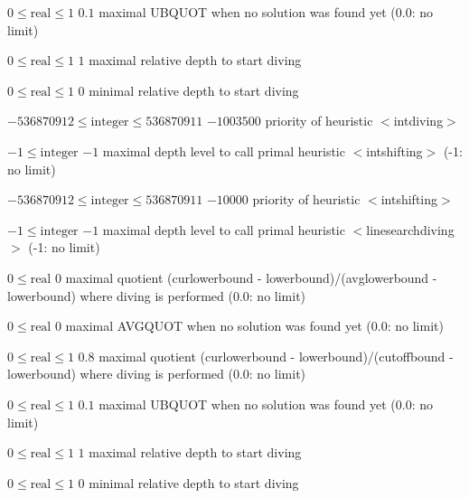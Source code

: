 %
{$0\leq\textrm{real}\leq1$}%
{$0.1$}%
{maximal UBQUOT when no solution was found yet (0.0: no limit)}%
{}

%
{$0\leq\textrm{real}\leq1$}%
{$1$}%
{maximal relative depth to start diving}%
{}

%
{$0\leq\textrm{real}\leq1$}%
{$0$}%
{minimal relative depth to start diving}%
{}

%
{$-536870912\leq\textrm{integer}\leq536870911$}%
{$-1003500$}%
{priority of heuristic $<$intdiving$>$}%
{}

%
{$-1\leq\textrm{integer}$}%
{$-1$}%
{maximal depth level to call primal heuristic $<$intshifting$>$ (-1: no limit)}%
{}

%
{$-536870912\leq\textrm{integer}\leq536870911$}%
{$-10000$}%
{priority of heuristic $<$intshifting$>$}%
{}

%
{$-1\leq\textrm{integer}$}%
{$-1$}%
{maximal depth level to call primal heuristic $<$linesearchdiving$>$ (-1: no limit)}%
{}

%
{$0\leq\textrm{real}$}%
{$0$}%
{maximal quotient (curlowerbound - lowerbound)/(avglowerbound - lowerbound) where diving is performed (0.0: no limit)}%
{}

%
{$0\leq\textrm{real}$}%
{$0$}%
{maximal AVGQUOT when no solution was found yet (0.0: no limit)}%
{}

%
{$0\leq\textrm{real}\leq1$}%
{$0.8$}%
{maximal quotient (curlowerbound - lowerbound)/(cutoffbound - lowerbound) where diving is performed (0.0: no limit)}%
{}

%
{$0\leq\textrm{real}\leq1$}%
{$0.1$}%
{maximal UBQUOT when no solution was found yet (0.0: no limit)}%
{}

%
{$0\leq\textrm{real}\leq1$}%
{$1$}%
{maximal relative depth to start diving}%
{}

%
{$0\leq\textrm{real}\leq1$}%
{$0$}%
{minimal relative depth to start diving}%
{}


